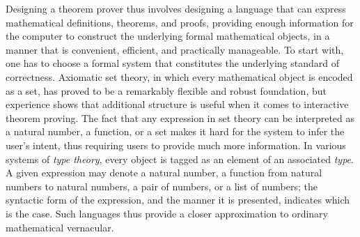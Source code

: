 \documentclass[12pt]{article}
\begin{document}
Designing a theorem prover thus involves designing a language that can express mathematical definitions, theorems, and proofs, providing enough information for the computer to construct the underlying formal mathematical objects, in a manner that is convenient, efficient, and practically manageable. To start with, one has to choose a formal system that constitutes the underlying standard of correctness. Axiomatic set theory, in which every mathematical object is encoded as a set, has proved to be a remarkably flexible and robust foundation, but experience shows that additional structure is useful when it comes to interactive theorem proving. The fact that any expression in set theory can be interpreted as a natural number, a function, or a set makes it hard for the system to infer the user's intent, thus requiring users to provide much more information. In various systems of \emph{type theory}, every object is tagged as an element of an associated \emph{type}. A given expression may denote a natural number, a function from natural numbers to natural numbers, a pair of numbers, or a list of numbers; the syntactic form of the expression, and the manner it is presented, indicates which is the case. Such languages thus provide a closer approximation to ordinary mathematical vernacular.
\end{document}
